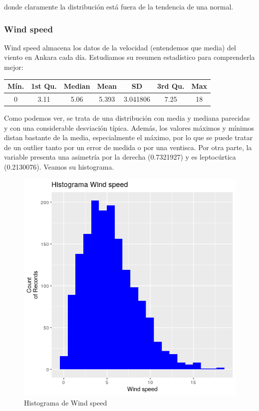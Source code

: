 donde claramente la distribución está fuera de la tendencia de una normal.

\subsubsection{Wind speed}

Wind speed almacena los datos de la velocidad (entendemos que media) del viento en Ankara cada día. Estudiamos su resumen estadístico para comprenderla mejor:

\begin{table}[H]
	\centering
	\begin{tabular}{|c|c|c|c|c|c|c|}
		\hline
		Mín. & 1st Qu. & Median & Mean  & SD       & 3rd Qu. & Max \\ \hline
		0    & 3.11    & 5.06   & 5.393 & 3.041806 & 7.25    & 18  \\ \hline
	\end{tabular}
\end{table}

Como podemos ver, se trata de una distribución con media y mediana parecidas y con una considerable desviación típica. Además, los valores máximos y mínimos distan bastante de la media, especialmente el máximo, por lo que se puede tratar de un outlier tanto por un error de medida o por una ventisca. Por otra parte, la variable presenta una asimetría por la derecha (0.7321927) y es leptocúrtica (0.2130076). Veamos su histograma.

\begin{figure}[H] %
	\centering
	\includegraphics[scale=0.7]{hist-ws.png}  %
	\caption{Histograma de Wind speed} 
	\label{fig:hist-ws}
\end{figure}

